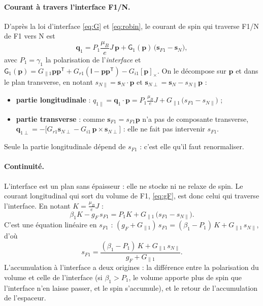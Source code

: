 \documentclass[11pt,a4paper]{article}
\newcommand{\vp}{\bm{p}}
\newcommand{\vs}{\bm{s}}
\newcommand{\vq}{\bm{q}}
\newcommand{\mG}{\mathsf{G}}
\newcommand{\Id}{\mathsf{I}}
\begin{document}
\paragraph{Courant à travers l'interface F1/N.} D'après la loi d'interface
\eqref{eq:G} et \eqref{eq:robin}, le courant de spin qui traverse F1/N de F1
vers N est
\begin{equation}
  \vq_1 = P_1\frac{\mu_B}{e}J\,\vp + \mG_1(\vp)\,\big(\vs_{F1} - \vs_N\big),
\end{equation}
avec $P_1 = \gamma_1$ la polarisation de l'\emph{interface} et
$\mG_1(\vp) = G_{\parallel1}\vp\vp^{\mathsf T} + G_{r1}(\Id-\vp\vp^{\mathsf T})
- G_{i1}[\vp]_\times$. On le décompose sur $\vp$ et dans le plan transverse,
en notant $s_{N\parallel} = \vs_N\cdot\vp$ et
$\vs_{N\perp} = \vs_N - s_{N\parallel}\vp$ :
\begin{itemize}
  \item \textbf{partie longitudinale} :
    $q_{1\parallel} = \vq_1\cdot\vp
    = P_1\frac{\mu_B}{e}J + G_{\parallel1}\,\big(s_{F1} - s_{N\parallel}\big)$ ;
  \item \textbf{partie transverse} : comme $\vs_{F1} = s_{F1}\vp$ n'a pas de
    composante transverse,
    $\vq_{1\perp} = -\big[G_{r1}\vs_{N\perp} - G_{i1}\,\vp\times\vs_{N\perp}\big]$ :
    elle ne fait pas intervenir $s_{F1}$.
\end{itemize}
Seule la partie longitudinale dépend de $s_{F1}$ : c'est elle qu'il faut
renormaliser.

\paragraph{Continuité.} L'interface est un plan sans épaisseur : elle ne
stocke ni ne relaxe de spin. Le courant longitudinal qui sort du volume de
F1, \eqref{eq:gF}, est donc celui qui traverse l'interface. En notant
$K = \frac{\mu_B}{e}J$ :
\begin{equation}
  \beta_1 K - g_F\,s_{F1}
  = P_1 K + G_{\parallel1}\,\big(s_{F1} - s_{N\parallel}\big).
  \label{eq:F1-continuite}
\end{equation}
C'est une équation linéaire en $s_{F1}$ :
$(g_F + G_{\parallel1})\,s_{F1} = (\beta_1 - P_1)\,K + G_{\parallel1}\,s_{N\parallel}$,
d'où
\begin{equation}
  s_{F1} = \frac{(\beta_1-P_1)\,K + G_{\parallel1}\,s_{N\parallel}}
  {g_F + G_{\parallel1}}.
  \label{eq:sF1}
\end{equation}
L'accumulation à l'interface a deux origines : la différence entre la
polarisation du volume et celle de l'interface (si $\beta_1>P_1$, le volume
apporte plus de spin que l'interface n'en laisse passer, et le spin
s'accumule), et le retour de l'accumulation de l'espaceur.
\end{document}
